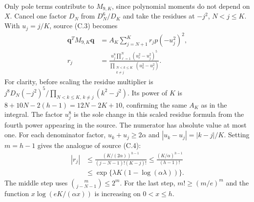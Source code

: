 Only pole terms contribute to $M_{9,K}$, since polynomial moments do
not depend on $X$.  Cancel one factor $D_N$ from $D_N^6/D_K$ and take
the residues at $-j^2$, $N<j\leq K$.  With $u_j=j/K$, source (C.3)
becomes
\begin{equation}
 \begin{aligned}
 \mathbf q^TM_{9,K}\mathbf q
    &=A_K\sum_{j=N+1}^{K}r_jp(-u_j^2)^2,\\
 r_j&=\frac{u_j^8\displaystyle\prod_{\ell=1}^{N}
                      (u_\ell^2-u_j^2)^5}
                 {\displaystyle\prod_{\substack{N<k\leq K\\k\ne j}}
                      (u_k^2-u_j^2)}.
 \end{aligned}
 \label{c-residues}
\end{equation}
For clarity, before scaling the residue multiplier is
$j^8D_N(-j^2)^5/\prod_{N<k\leq K,\,k\ne j}(k^2-j^2)$.
Its power of $K$ is
$8+10N-2(h-1)=12N-2K+10$, confirming the same $A_K$ as in the integral.
The factor $u_j^8$ is the sole change in this scaled residue formula
from the fourth power appearing in the source.
The numerator has absolute value at most one.  For each denominator
factor, $u_k+u_j\geq2\alpha$ and
$|u_k-u_j|=|k-j|/K$.  Setting $m=h-1$ gives the analogue of source (C.4):
\begin{equation}
 \begin{aligned}
 |r_j|&\leq
 \frac{(K/(2\alpha))^{h-1}}{(j-N-1)!(K-j)!}
 \leq\frac{(K/\alpha)^{h-1}}{(h-1)!}\\
 &\leq\exp\{\lambda K(1-\log(\alpha\lambda))\}.
 \end{aligned}
 \label{c-residue-bound}
\end{equation}
The middle step uses $\binom m{j-N-1}\leq2^m$.  For the last step,
$m!\geq(m/e)^m$ and the function $x\log(eK/(\alpha x))$ is increasing
on $0<x\leq h$.

